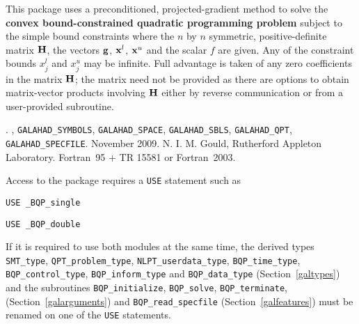 \documentclass{galahad}
\newcommand{\packagename}{BQP}
\newcommand{\fullpackagename}{\libraryname\_\packagename}
\begin{document}
\galheader


\galsummary
This package uses a preconditioned, projected-gradient method
to solve the {\bf convex bound-constrained quadratic programming problem}
subject to the simple bound constraints
where the $n$ by $n$ symmetric, positive-definite matrix ${\mathbf{H}}$, the 
vectors ${\mathbf{g}}$, ${\mathbf{x}}^{l}$, ${\mathbf{x}}^{u}$ and the scalar $f$ are given.
Any of the constraint bounds $x_{j}^{l}$ and $x_{j}^{u}$ may be infinite.
Full advantage is taken of any zero coefficients in the matrix ${\mathbf{H}}$;
the matrix need not be provided as there are options to obtain matrix-vector
products involving ${\mathbf{H}}$ either by reverse communication or from a 
user-provided subroutine.


\galattributes
\galversions{\tt  \fullpackagename\_single, \fullpackagename\_double}.
,
{\tt GALAHAD\_SY\-M\-BOLS}, 
{\tt GALAHAD\-\_\-SPACE}, 
{\tt GALAHAD\_SBLS},
{\tt GALAHAD\_QPT},
{\tt GALAHAD\_SPECFILE}.
\galdate November 2009.
\galorigin N. I. M. Gould, Rutherford Appleton Laboratory.
\gallanguage Fortran~95 + TR 15581 or Fortran~2003. 


\galhowto


Access to the package requires a {\tt USE} statement such as

\medskip{}

\hspace{8mm} {\tt USE \fullpackagename\_single}

\medskip{}

\hspace{8mm} {\tt USE  \fullpackagename\_double}

\medskip

\noindent
If it is required to use both modules at the same time, the derived types 
{\tt SMT\_type}, 
{\tt QPT\_problem\_type}, 
{\tt NLPT\_userdata\-\_type},
{\tt \packagename\_time\_type}, 
{\tt \packagename\_control\_type}, 
{\tt \packagename\_inform\_type} 
and
{\tt \packagename\_data\_type}
(Section~\ref{galtypes})
and the subroutines
{\tt \packagename\_initialize}, 
{\tt \packagename\_\-solve},
{\tt \packagename\_terminate},
(Section~\ref{galarguments})
and 
{\tt \packagename\_read\_specfile}
(Section~\ref{galfeatures})
must be renamed on one of the {\tt USE} statements.
\end{document}
